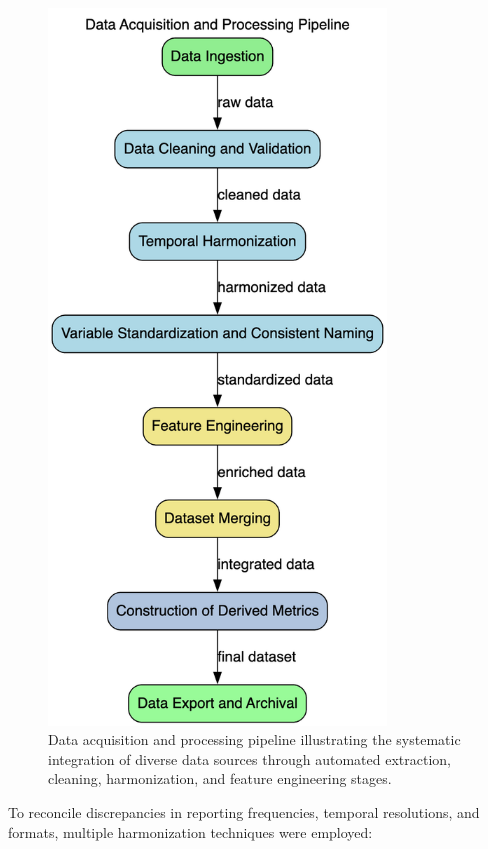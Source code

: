 \begin{figure}[htbp]
\centering
\includegraphics[width=0.8\textwidth]{images/dataacq.png}
\caption{Data acquisition and processing pipeline illustrating the systematic integration of diverse data sources through automated extraction, cleaning, harmonization, and feature engineering stages.}
\label{fig:data_pipeline}
\end{figure}

To reconcile discrepancies in reporting frequencies, temporal resolutions, and formats, multiple harmonization techniques were employed:

